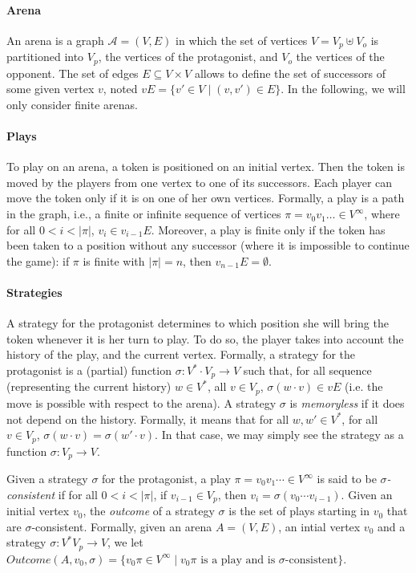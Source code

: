 \documentclass[envcountsame]{llncs} \usepackage[english]{babel}
\newcommand{\arena}{\ensuremath{\mathcal{A}}}
\newcommand{\Outcome}{\ensuremath{\mathit{Outcome}}}
\begin{document}
\paragraph{Arena} An arena is a graph $\arena=(V,E)$ in which the set of vertices
$V=V_p\uplus V_o$ is partitioned into $V_p$, the vertices of the protagonist, and $V_o$
the vertices of the opponent. The set of edges $E\subseteq V\times V$ allows to
define the set of successors of some given vertex $v$, noted $vE=\{v'\in V\mid
(v,v')\in E\}$. In the following, we will only consider finite arenas.

\paragraph{Plays} To play on an arena, a token is positioned on an initial vertex. Then the token is moved by 
the players from one vertex to 
one of its successors. Each player can move the token only if it is on one of her own vertices. Formally, a play is
a path in the graph, i.e., a finite or infinite sequence of vertices $\pi = v_0v_1\dots \in V^\infty$,
where for all $0< i < |\pi|$,  $v_{i} \in v_{i-1}E$. Moreover, a play is finite only if the token
has been taken to a position without any successor (where it is impossible to continue the game): 
if $\pi$ is finite with $|\pi|=n$, then $v_{n-1}E=\emptyset$.

\paragraph{Strategies}A strategy for the protagonist determines
to which position she will bring the token whenever it is her turn to play.
To do so, the player takes into account the history of the play, and the current
vertex.
Formally, a strategy for the protagonist is a (partial) function
$\sigma : V^*\cdot V_p \rightarrow V$ such that, for all sequence (representing the
current history) $w\in V^*$, all $v\in V_p$, $\sigma
(w\cdot v)\in vE$ (i.e. the move is possible with respect to the arena). 
A strategy $\sigma$ is \emph{memoryless} if it does not depend on the history. Formally, it means
that for all
$w, w'\in V^*$, for all $v\in V_p$, $\sigma(w\cdot v) = \sigma(w'\cdot v)$. In that case,
we may simply see the strategy as a function $\sigma:V_p\rightarrow V$.

Given a strategy $\sigma$ for the protagonist, a play $\pi=v_0v_1\cdots \in V^\infty$
 is said to be \emph{$\sigma$-consistent} if for all $0<i<|\pi|$, if $v_{i-1}\in V_p$, then $v_i=\sigma
(v_0\cdots v_{i-1})$. Given an initial
vertex $v_0$, the \emph{outcome} of a strategy $\sigma$ is the set of plays starting in $v_0$
that are $\sigma$-consistent. Formally, given an arena $A=(V,E)$, an intial vertex $v_0$ and 
a strategy $\sigma:V^*V_p\rightarrow V$, we let $\Outcome(A,v_0,\sigma)=\{v_0\pi \in V^\infty\mid v_0\pi
\textrm{ is a play and is $\sigma$-consistent}\}$.
\end{document}
